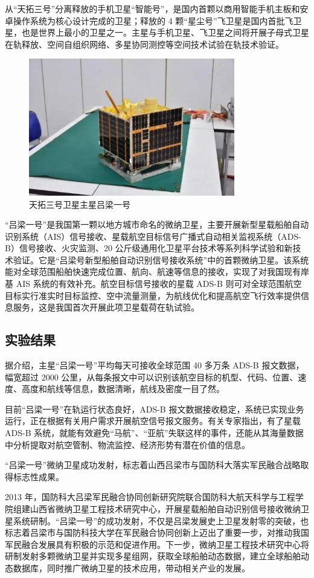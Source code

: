 从“天拓三号”分离释放的手机卫星“智能号”，是国内首颗以商用智能手机主板和安卓操作系统为核心设计完成的卫星；释放的 4 颗“星尘号”飞卫星是国内首批飞卫星，也是世界上最小的卫星之一。主星与手机卫星、飞卫星之间将开展子母式卫星在轨释放、空间自组织网络、多星协同测控等空间技术试验在轨技术验证。
\begin{figure}[!htb]
\centering
\includegraphics[width=9cm]{pic/tiantuo3.jpg}
\caption{天拓三号卫星主星吕梁一号\protect\footnotemark}
\label{fig:tiantuo3}
\end{figure}


“吕梁一号”是我国第一颗以地方城市命名的微纳卫星，主要开展新型星载船舶自动识别系统（AIS）信号接收、星载航空目标信号广播式自动相关监视系统（ADS-B）信号接收、火灾监测、20 公斤级通用化卫星平台技术等系列科学试验和新技术验证。它是“吕梁号新型船舶自动识别信号接收系统”中的首颗微纳卫星。该系统能对全球范围船舶快速完成位置、航向、航速等信息的接收，实现了对我国现有岸基 AIS 系统的有效补充。航空目标信号接收的星载 ADS-B 则可对全球范围航空目标实行准实时目标监控、空中流量测量，为航线优化和提高航空飞行效率提供信息服务，这是我国首次开展此项卫星载荷在轨试验。

\subsection{实验结果}

据介绍，主星“吕梁一号”平均每天可接收全球范围 40 多万条 ADS-B 报文数据，幅宽超过 2000 公里，从每条报文中可以识别该航空目标的机型、代码、位置、速度、高度和航线等信息，数据清晰，航线及密度一目了然。

目前“吕梁一号”在轨运行状态良好，ADS-B 报文数据接收稳定，系统已实现业务运行，正在根据有关用户需求开展航空信号报文服务。有关专家指出，有了星载 ADS-B 系统，就能有效避免“马航”、“亚航”失联这样的事件，还能从其海量数据中分析提取对航空管制、物流监控、经济形势有潜在价值的信息。

“吕梁一号”微纳卫星成功发射，标志着山西吕梁市与国防科大落实军民融合战略取得标志性成果。

2013 年，国防科大吕梁军民融合协同创新研究院联合国防科大航天科学与工程学院组建山西省微纳卫星工程技术研究中心，开展星载船舶自动识别信号接收微纳卫星系统研制。“吕梁一号”的成功发射，不仅是吕梁发展史上卫星发射零的突破，也标志着吕梁市与国防科技大学在军民融合协同创新上迈出了重要一步，对推动我国军民融合发展具有积极的示范和促进作用。下一步，微纳卫星工程技术研究中心将研制发射多颗微纳卫星并实现多星组网，获取全球船舶动态数据，建立全球船舶动态数据库，同时推广微纳卫星的技术应用，带动相关产业的发展。

